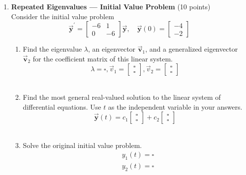 \begin{enumerate}
  \item \textbf{Repeated Eigenvalues --- Initial Value Problem} (10 points)\\
  Consider the initial value problem
  $$
  \overrightarrow{\boldsymbol{y}}^{\prime}=\left[\begin{array}{rr}
  -6 & 1 \\
  0 & -6
  \end{array}\right] \overrightarrow{\boldsymbol{y}}, \quad \overrightarrow{\boldsymbol{y}}(0)=\left[\begin{array}{l}
  -4 \\
  -2
  \end{array}\right]
  $$
  \begin{enumerate}[label=\alph*]
    \item Find the eigenvalue $\lambda$, an eigenvector $\overrightarrow{\boldsymbol{v}}_1$, and a generalized eigenvector $\overrightarrow{\boldsymbol{v}}_2$ for the coefficient matrix of this linear system.\\
    $$
    \lambda=\square, \vec{v}_1=\left[\begin{array}{l}
    \square \\
    \square
    \end{array}\right], \vec{v}_2=\left[\begin{array}{l}
    \square \\
    \square
    \end{array}\right]
    $$\\
    \begin{subanswer}
    \end{subanswer}
    \item Find the most general real-valued solution to the linear system of differential equations. Use $t$ as the independent variable in your answers.\\
    $$
    \overrightarrow{\boldsymbol{y}}(t)=c_1\left[\begin{array}{l}
    \square \\
    \square
    \end{array}\right]+c_2\left[\begin{array}{l}
    \square \\
    \square
    \end{array}\right]
    $$\\
    \begin{subanswer}
    \end{subanswer}
    \item Solve the original initial value problem.\\
    $$
    \begin{aligned}
    & y_1(t)=\square \\
    & y_2(t)=\square
    \end{aligned}
    $$\\
    \begin{subanswer}
    \end{subanswer}
  \end{enumerate}


\end{enumerate}
